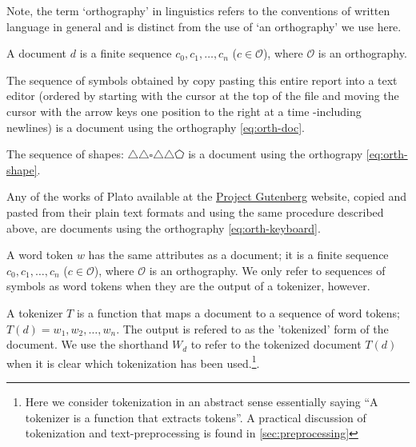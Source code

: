 Note, the term `orthography' in linguistics refers to the conventions of written language in general and is distinct from the use of `an orthography' we use here.

\begin{definition}[Document]
  A document $d$ is a finite sequence $c_0,c_1,\dots,c_n$ ($c\in\mathscr{O}$), where $\mathscr{O}$ is an orthography.
\end{definition}

\begin{example}\label{ex:doc-report}
    The sequence of symbols obtained by copy pasting this entire report into a text editor (ordered by starting with the cursor at the top of the file and moving the cursor with the arrow keys one position to the right at a time -including newlines) is a document using the orthography \ref{eq:orth-doc}.
\end{example}
\vspace{6pt}

\begin{example}\label{ex:doc-shapes}
    The sequence of shapes: \emph{$\triangle\triangle\square\triangle\triangle\pentagon$} is a document using the orthograpy \ref{eq:orth-shape}.
\end{example}
\vspace{6pt}

\begin{example}\label{ex:doc-plato}
    Any of the works of Plato available at the \href{https://www.gutenberg.org/ebooks/author/93}{Project Gutenberg} website, copied and pasted from their plain text formats and using the same procedure described above, are documents using the orthography \ref{eq:orth-keyboard}.
\end{example}

\begin{definition}
  A word token $w$ has the same attributes as a document; it is a finite sequence $c_0,c_1,\dots,c_n$ ($c\in\mathscr{O}$), where $\mathscr{O}$ is an orthography. We only refer to sequences of symbols as word tokens when they are the output of a tokenizer, however.
\end{definition}
\begin{definition}[Tokenizer]
   A tokenizer $T$ is a function that maps a document to a sequence of word tokens; $T(d)=w_1,w_2,\dots,w_n$. The output is refered to as the 'tokenized' form of the document. We use the shorthand $W_d$ to refer to the tokenized document $T(d)$ when it is clear which tokenization has been used.\footnote{Here we consider tokenization in an abstract sense essentially saying ``A tokenizer is a function that extracts tokens''. A practical discussion of tokenization and text-preprocessing is found in \autoref{sec:preprocessing}}.
\end{definition}


